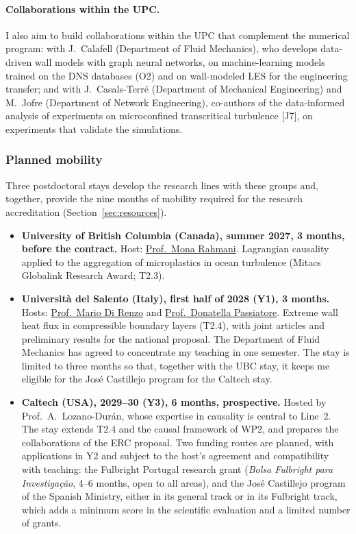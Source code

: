 \documentclass[11pt]{article}
\begin{document}
\paragraph{Collaborations within the UPC.} I also aim to build collaborations within the UPC that
complement the numerical program: with J.\ Calafell (Department of Fluid Mechanics), who develops
data-driven wall models with graph neural networks, on machine-learning models trained on the DNS
databases (O2) and on wall-modeled LES for the engineering transfer; and with J.\ Casals-Terr\'e
(Department of Mechanical Engineering) and M.\ Jofre (Department of Network Engineering), co-authors
of the data-informed analysis of experiments on microconfined transcritical turbulence [J7], on
experiments that validate the simulations.

\subsubsection*{Planned mobility}
Three postdoctoral stays develop the research lines with these groups and, together, provide the
nine months of mobility required for the research accreditation (Section~\ref{sec:resources}).
\begin{itemize}
  \item \textbf{University of British Columbia (Canada), summer 2027, 3 months, before the
  contract.} Host: \href{https://chbe.ubc.ca/mona-rahmani/}{Prof.\ Mona Rahmani}. Lagrangian
  causality applied to the aggregation of microplastics in ocean turbulence (Mitacs Globalink
  Research Award; T2.3).
  
  \item \textbf{Universit\`a del Salento (Italy), first half of 2028 (Y1), 3 months.} Hosts:
  \href{https://www.unisalento.it/scheda-utente/-/people/mario.direnzo}{Prof.\ Mario Di Renzo}
  and \href{https://www.unisalento.it/scheda-utente/-/people/donatella.passiatore}{Prof.\
  Donatella Passiatore}. Extreme wall heat flux in compressible boundary layers (T2.4), with
  joint articles and preliminary results for the national proposal. The Department of Fluid
  Mechanics has agreed to concentrate my teaching in one semester. The stay is limited to
  three months so that, together with the UBC stay, it keeps me eligible for the José
  Castillejo program for the Caltech stay.
  
  \item \textbf{Caltech (USA), 2029--30 (Y3), 6 months,
  prospective.} Hosted by Prof.\ A.\ Lozano-Dur\'an, whose expertise in causality is central to Line~2. The stay extends T2.4 and the causal framework of WP2, and prepares the collaborations of the ERC proposal. Two funding routes are planned,
  with applications in Y2 and subject to the host's agreement and compatibility with
  teaching: the Fulbright Portugal research grant (\emph{Bolsa Fulbright para
  Investiga\c{c}\~ao}, 4--6 months, open to all areas), and the José Castillejo program of the
  Spanish Ministry, either in its general track or in its Fulbright track, which adds a minimum
  score in the scientific evaluation and a limited number of grants.
\end{itemize}
\end{document}
